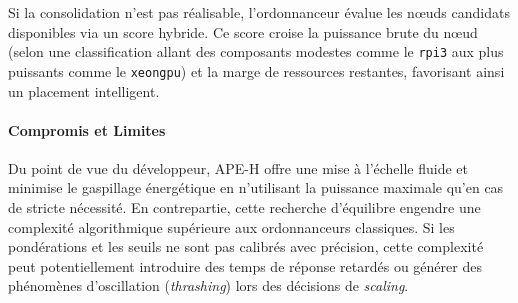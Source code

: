 Si la consolidation n'est pas réalisable, l'ordonnanceur évalue les nœuds candidats disponibles via un score hybride. Ce score croise la puissance brute du nœud (selon une classification allant des composants modestes comme le \texttt{rpi3} aux plus puissants comme le \texttt{xeongpu}) et la marge de ressources restantes, favorisant ainsi un placement intelligent.

\paragraph{Compromis et Limites}

Du point de vue du développeur, APE-H offre une mise à l'échelle fluide et minimise le gaspillage énergétique en n'utilisant la puissance maximale qu'en cas de stricte nécessité. En contrepartie, cette recherche d'équilibre engendre une complexité algorithmique supérieure aux ordonnanceurs classiques. Si les pondérations et les seuils ne sont pas calibrés avec précision, cette complexité peut potentiellement introduire des temps de réponse retardés ou générer des phénomènes d'oscillation (\textit{thrashing}) lors des décisions de \textit{scaling}.